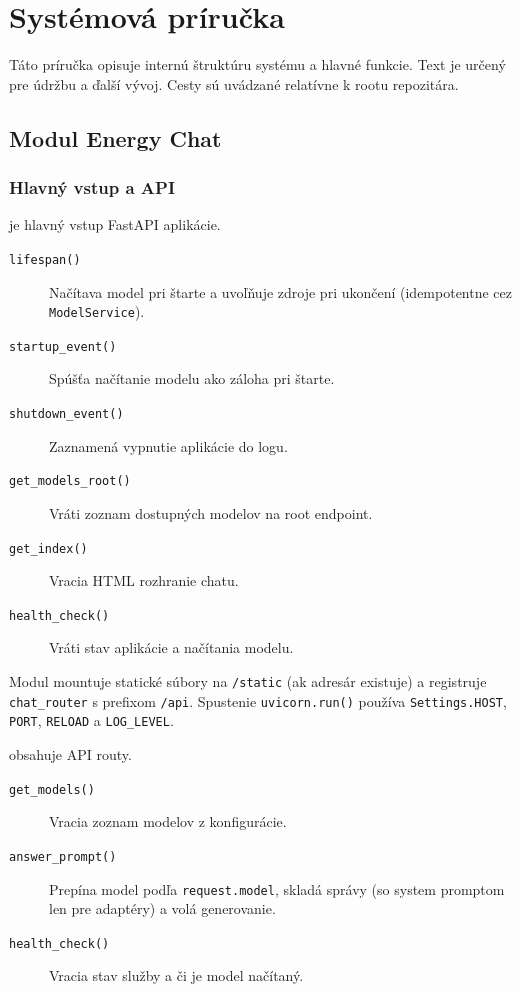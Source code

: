 
\chapter{Systémová príručka}\label{app:system.manual}

Táto príručka opisuje internú štruktúru systému a hlavné funkcie. Text je určený pre údržbu a ďalší vývoj. Cesty sú uvádzané relatívne k rootu repozitára.

\section{Modul Energy Chat}

\subsection{Hlavný vstup a API}

\textbf{} je hlavný vstup FastAPI aplikácie.
\begin{description}
	\item[\texttt{lifespan()}] Načítava model pri štarte a uvoľňuje zdroje pri ukončení (idempotentne cez \texttt{ModelService}).
	\item[\texttt{startup\_event()}] Spúšťa načítanie modelu ako záloha pri štarte.
	\item[\texttt{shutdown\_event()}] Zaznamená vypnutie aplikácie do logu.
	\item[\texttt{get\_models\_root()}] Vráti zoznam dostupných modelov na root endpoint.
	\item[\texttt{get\_index()}] Vracia HTML rozhranie chatu.
	\item[\texttt{health\_check()}] Vráti stav aplikácie a načítania modelu.
\end{description}

Modul mountuje statické súbory na \texttt{/static} (ak adresár existuje) a registruje \texttt{chat\_router} s prefixom \texttt{/api}. Spustenie \texttt{uvicorn.run()} používa \texttt{Settings.HOST}, \texttt{PORT}, \texttt{RELOAD} a \texttt{LOG\_LEVEL}.

\textbf{} obsahuje API routy.
\begin{description}
	\item[\texttt{get\_models()}] Vracia zoznam modelov z konfigurácie.
	\item[\texttt{answer\_prompt()}] Prepína model podľa \texttt{request.model}, skladá správy (so system promptom len pre adaptéry) a volá generovanie.
	\item[\texttt{health\_check()}] Vracia stav služby a či je model načítaný.
\end{description}

